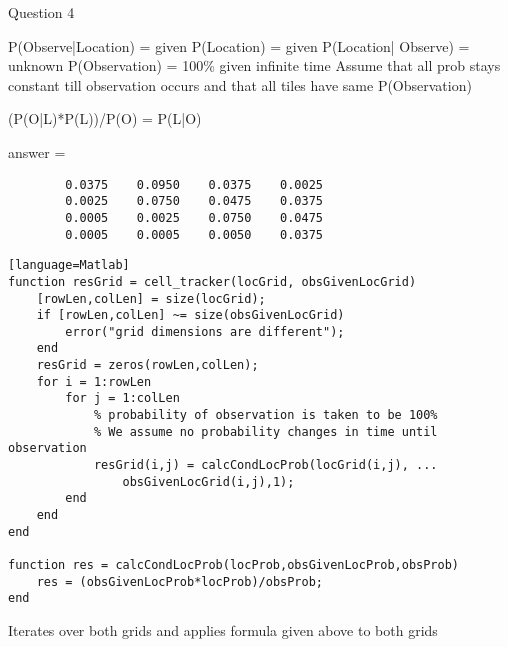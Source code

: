 \documentclass[12pt]{article}
\begin{document}
\begin{flushleft}
Question 4

	P(Observe|Location) = given \newline
	P(Location) = given \newline
	P(Location| Observe) = unknown \newline
	P(Observation) = 100\% given infinite time \newline
	Assume that all prob stays constant till observation occurs and that all tiles have same P(Observation) 
	
	(P(O|L)*P(L))/P(O) = P(L|O)
	
	answer = 
	\begin{verbatim}
    	0.0375    0.0950    0.0375    0.0025
    	0.0025    0.0750    0.0475    0.0375
    	0.0005    0.0025    0.0750    0.0475
    	0.0005    0.0005    0.0050    0.0375
    	\end{verbatim}
    	
\begin{minipage}{\textwidth}
\begin{lstlisting}[tabsize=4][language=Matlab]
function resGrid = cell_tracker(locGrid, obsGivenLocGrid)
	[rowLen,colLen] = size(locGrid);
	if [rowLen,colLen] ~= size(obsGivenLocGrid)
		error("grid dimensions are different");
	end
	resGrid = zeros(rowLen,colLen);
	for i = 1:rowLen
		for j = 1:colLen
			% probability of observation is taken to be 100%
			% We assume no probability changes in time until observation
			resGrid(i,j) = calcCondLocProb(locGrid(i,j), ...
				obsGivenLocGrid(i,j),1);
		end
	end
end

function res = calcCondLocProb(locProb,obsGivenLocProb,obsProb)
	res = (obsGivenLocProb*locProb)/obsProb;
end
\end{lstlisting}
\end{minipage}

Iterates over both grids and applies formula given above to both grids
	
\end{flushleft}
\end{document}
